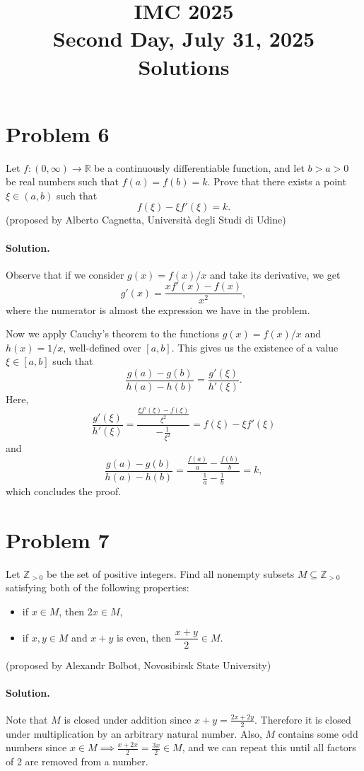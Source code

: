 \documentclass{article}
\title{IMC 2025 \\ Second Day, July 31, 2025 \\ Solutions}
\date{}
\begin{document}
\maketitle

\section*{Problem 6}
Let $f : (0, \infty) \to \mathbb{R}$ be a continuously differentiable function, and let $b > a > 0$ be real numbers such that $f(a) = f(b) = k$. Prove that there exists a point $\xi \in (a,b)$ such that
\[
f(\xi) - \xi f'(\xi) = k.
\]
(proposed by Alberto Cagnetta, Universit\`a degli Studi di Udine)

\paragraph{Solution.}
Observe that if we consider $g(x) = f(x)/x$ and take its derivative, we get
\[
g'(x) = \frac{x f'(x) - f(x)}{x^2},
\]
where the numerator is almost the expression we have in the problem.

Now we apply Cauchy's theorem to the functions $g(x) = f(x)/x$ and $h(x) = 1/x$, well-defined over $[a,b]$. This gives us the existence of a value $\xi \in [a,b]$ such that
\[
\frac{g(a) - g(b)}{h(a) - h(b)} = \frac{g'(\xi)}{h'(\xi)}.
\]
Here,
\[
\frac{g'(\xi)}{h'(\xi)} = \frac{\frac{\xi f'(\xi) - f(\xi)}{\xi^2}}{-\frac{1}{\xi^2}} = f(\xi) - \xi f'(\xi)
\]
and
\[
\frac{g(a) - g(b)}{h(a) - h(b)} = \frac{\frac{f(a)}{a} - \frac{f(b)}{b}}{\frac{1}{a} - \frac{1}{b}} = k,
\]
which concludes the proof.

\section*{Problem 7}
Let $\mathbb{Z}_{>0}$ be the set of positive integers. Find all nonempty subsets $M \subseteq \mathbb{Z}_{>0}$ satisfying both of the following properties:
\begin{itemize}
\item[(a)] if $x \in M$, then $2x \in M$,
\item[(b)] if $x, y \in M$ and $x + y$ is even, then $\dfrac{x+y}{2} \in M$.
\end{itemize}
(proposed by Alexandr Bolbot, Novosibirsk State University)

\paragraph{Solution.}
Note that $M$ is closed under addition since $x + y = \frac{2x + 2y}{2}$. Therefore it is closed under multiplication by an arbitrary natural number. Also, $M$ contains some odd numbers since $x \in M \implies \frac{x + 2x}{2} = \frac{3x}{2} \in M$, and we can repeat this until all factors of 2 are removed from a number.
\end{document}
